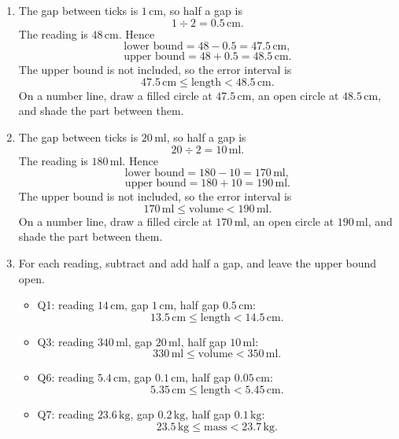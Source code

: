 \documentclass[11pt,a4paper]{article}
\begin{document}
\begin{enumerate}[label=\textbf{Q\arabic*.}, start=9, leftmargin=*, itemsep=8pt]

\item 
\begin{solbox}
The gap between ticks is \(1\,\text{cm}\), so half a gap is
\[
1\div 2=0.5\,\text{cm}.
\]
The reading is \(48\,\text{cm}\). Hence
\[
\text{lower bound}=48-0.5=47.5\,\text{cm},
\]
\[
\text{upper bound}=48+0.5=48.5\,\text{cm}.
\]
The upper bound is not included, so the error interval is
\[
\boxed{47.5\,\text{cm}\le \text{length}<48.5\,\text{cm}}.
\]
On a number line, draw a filled circle at \(47.5\,\text{cm}\), an open circle at \(48.5\,\text{cm}\), and shade the part between them.
\end{solbox}

\item 
\begin{solbox}
The gap between ticks is \(20\,\text{ml}\), so half a gap is
\[
20\div 2=10\,\text{ml}.
\]
The reading is \(180\,\text{ml}\). Hence
\[
\text{lower bound}=180-10=170\,\text{ml},
\]
\[
\text{upper bound}=180+10=190\,\text{ml}.
\]
The upper bound is not included, so the error interval is
\[
\boxed{170\,\text{ml}\le \text{volume}<190\,\text{ml}}.
\]
On a number line, draw a filled circle at \(170\,\text{ml}\), an open circle at \(190\,\text{ml}\), and shade the part between them.
\end{solbox}

\item 
\begin{solbox}
For each reading, subtract and add half a gap, and leave the upper bound open.
\begin{itemize}[leftmargin=*, itemsep=2pt]
\item Q1: reading \(14\,\text{cm}\), gap \(1\,\text{cm}\), half gap \(0.5\,\text{cm}\):
\[
13.5\,\text{cm}\le \text{length}<14.5\,\text{cm}.
\]
\item Q3: reading \(340\,\text{ml}\), gap \(20\,\text{ml}\), half gap \(10\,\text{ml}\):
\[
330\,\text{ml}\le \text{volume}<350\,\text{ml}.
\]
\item Q6: reading \(5.4\,\text{cm}\), gap \(0.1\,\text{cm}\), half gap \(0.05\,\text{cm}\):
\[
5.35\,\text{cm}\le \text{length}<5.45\,\text{cm}.
\]
\item Q7: reading \(23.6\,\text{kg}\), gap \(0.2\,\text{kg}\), half gap \(0.1\,\text{kg}\):
\[
23.5\,\text{kg}\le \text{mass}<23.7\,\text{kg}.
\]
\end{itemize}
\end{solbox}


\end{enumerate}
\end{document}
